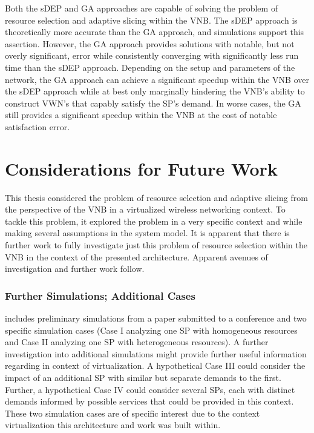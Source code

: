 \documentclass[12pt,dvipsnames]{report}
\begin{document}
Both the sDEP and GA approaches are capable of solving the problem of resource selection and adaptive slicing within the VNB.  The sDEP approach is theoretically more accurate than the GA approach, and simulations support this assertion.  However, the GA approach provides solutions with notable, but not overly significant, error while consistently converging with significantly less run time than the sDEP approach.  Depending on the setup and parameters of the network, the GA approach can achieve a significant speedup within the VNB over the sDEP approach while at best only marginally hindering the VNB's ability to construct VWN's that capably satisfy the SP's demand.  In worse cases, the GA still provides a significant speedup within the VNB at the cost of notable satisfaction error.

\section{Considerations for Future Work} \label{sec:futurework}

This thesis considered the problem of resource selection and adaptive slicing from the perspective of the VNB in a virtualized wireless networking context.  To tackle this problem, it explored the problem in a very specific context and while making several assumptions in the system model.  It is apparent that there is further work to fully investigate just this problem of resource selection within the VNB in the context of the presented architecture.  Apparent avenues of investigation and further work follow.

\subsubsection{Further Simulations; Additional Cases}

 includes preliminary simulations from a paper submitted to a conference and two specific simulation cases (Case I analyzing one SP with homogeneous resources and Case II analyzing one SP with heterogeneous resources).  A further investigation into additional simulations might provide further useful information regarding in context of virtualization.  A hypothetical Case III could consider the impact of an additional SP with similar but separate demands to the first.  Further, a hypothetical Case IV could consider several SPs, each with distinct demands informed by possible services that could be provided in this context.  These two simulation cases are of specific interest due to the context virtualization this architecture and work was built within.
\end{document}
